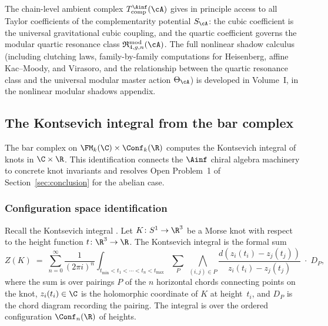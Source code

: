 \begin{remark}
\label{rem:nonlinear-shadow-pointer}
The chain-level ambient complex
$T_{\mathrm{comp}}^{\Ainf}(\cA)$ gives in principle
access to all Taylor coefficients of the complementarity
potential $S_\cA$: the cubic coefficient is the universal
gravitational cubic coupling, and the quartic coefficient
governs the modular quartic resonance class
$\mathfrak{R}_{4,g,n}^{\mathrm{mod}}(\cA)$. The full
nonlinear shadow calculus (including clutching laws,
family-by-family computations for Heisenberg, affine Kac--Moody,
and Virasoro, and the relationship between the quartic
resonance class and the universal modular master action
$\Theta_\cA$) is developed in Volume~I,
in the nonlinear modular shadows appendix.
\end{remark}


\subsection{The Kontsevich integral from the bar complex}
\label{subsec:kontsevich-from-bar}

The bar complex on $\FM_k(\C) \times \Conf_k(\R)$ computes the
Kontsevich integral of knots in $\C \times \R$. This
identification connects the $\Ainf$ chiral algebra machinery to
concrete knot invariants and resolves Open Problem~1 of
Section~\ref{sec:conclusion} for the abelian case.

\subsubsection{Configuration space identification}

Recall the Kontsevich integral \cite{Kon94}. Let
$K \colon S^1 \to \R^3$ be a Morse knot with respect to the
height function $t \colon \R^3 \to \R$. The Kontsevich integral
is the formal sum
\begin{equation}
\label{eq:kontsevich-integral}
Z(K) \;=\; \sum_{n=0}^{\infty} \frac{1}{(2\pi i)^n}
\int_{t_{{\min}} < t_1 < \cdots < t_n < t_{{\max}}}
\sum_{P} \;\bigwedge_{(i,j) \in P}
\frac{d(z_i(t_i) - z_j(t_j))}{z_i(t_i) - z_j(t_j)}
\;\cdot\; D_P,
\end{equation}
where the sum is over pairings $P$ of the $n$ horizontal chords
connecting points on the knot, $z_i(t_i) \in \C$ is the
holomorphic coordinate of $K$ at height~$t_i$, and $D_P$ is
the chord diagram recording the pairing. The integral is over
the ordered configuration $\Conf_n(\R)$ of heights.

